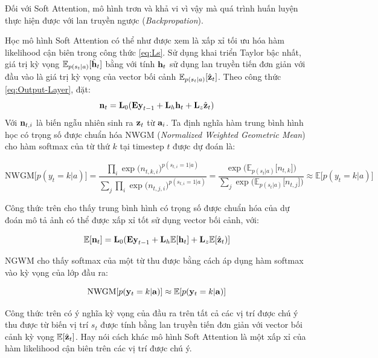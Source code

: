 \documentclass[14pt, a4paper]{article}
\numberwithin{equation}{section}
\numberwithin{algorithm}{section}
\numberwithin{figure}{section}
\numberwithin{dl}{section}
\numberwithin{md}{section}
\numberwithin{bd}{section}
\numberwithin{dn}{section}
\numberwithin{hq}{section}
\begin{document}
\begin{enumerate}[label=(\alph*)]
        Đối với Soft Attention, mô hình trơn và khả vi vì vậy mà quá trình huấn luyện thực hiện được với lan truyền ngược (\textit{Backpropation}).

        Học mô hình Soft Attention có thể như được xem là xấp xỉ tối ưu hóa hàm likelihood cận biên trong công thức \ref{eq:Ls}.
        Sử dụng khai triển Taylor bậc nhất, giá trị kỳ vọng $\mathbb{E}_{p(s_t \vert a)}\lbrack \hat{\bold{h}}_t \rbrack$ bằng với tính $\bold{h}_t$ sử dụng lan truyền tiến đơn giản với đầu vào là giá trị kỳ vọng của vector bối cảnh $\mathbb{E}_{p(s_t \vert a)}\lbrack \hat{\bold{z}}_t \rbrack$.
        Theo công thức \ref{eq:Output-Layer}, đặt:
        \begin{equation}
            \bold{n}_t = \bold{L}_0(\bold{Ey}_{t-1} + \bold{L}_h\bold{h}_t + \bold{L}_z \hat{\bold{z}}_t)
        \end{equation}
        Với $\bold{n}_{t,i}$ là biến ngẫu nhiên sinh ra $\bold{z}_t$ từ $\bold{a}_i$. Ta định nghĩa hàm trung bình hình học có trọng số được chuẩn hóa NWGM (\textit{Normalized Weighted Geometric Mean}) cho hàm softmax của từ thứ $k$ tại timestep $t$ được dự đoán là:

        \begin{equation}
            \mathrm{NWGM}\lbrack p(y_t=k\vert a) \rbrack=\dfrac{\displaystyle \prod_i \exp\big( n_{t, k, i} \big)^{p(s_{t,i}=1\vert a)}}{\displaystyle \sum_j \prod_i \exp\big( n_{t, j, i} \big)^{p(s_{t,i}=1\vert a)}}=\dfrac{\exp\big( \mathbb{E}_{p(s_t \vert a)} \lbrack n_{t,k} \rbrack  \big)}{\displaystyle \sum_j \exp \big(\mathbb{E}_{p(s_t \vert a)} \lbrack n_{t,j} \rbrack \big)}\approx \mathbb{E} \lbrack p(y_t=k \vert a)\rbrack
        \end{equation}

        Công thức trên cho thấy trung bình hình có trọng số được chuẩn hóa của dự đoán mô tả ảnh có thể được xấp xỉ tốt sử dụng vector bối cảnh, với:

        \begin{equation}
            \mathbb {E}\lbrack \bold{n}_t \rbrack = \bold{L}_0(\bold{Ey}_{t-1} + \bold{L}_h \mathbb{E} \lbrack \bold{h}_t \rbrack + \bold{L}_z \mathbb{E} \lbrack \hat{\bold{z}}_t) \rbrack
        \end{equation}

        NGWM cho thấy softmax của một từ thu được bằng cách áp dụng hàm softmax vào kỳ vọng của lớp đầu ra:

        \begin{equation}
            \mathrm{NWGM}\lbrack p(\bold{y}_t = k \vert \bold{a}) \rbrack \approx \mathbb{E} \lbrack p(\bold{y}_t = k \vert \bold{a}) \rbrack
        \end{equation}

        Công thức trên có ý nghĩa kỳ vọng của đầu ra trên tất cả các vị trí được chú ý thu được từ biến vị trí $s_t$ được tính bằng lan truyền tiến đơn giản với vector bối cảnh kỳ vọng $\mathbb{E} \lbrack \hat{\bold{z}}_t \rbrack$.
        Hay nói cách khác mô hình Soft Attention là một xấp xỉ của hàm likelihood cận biên trên các vị trí được chú ý.
    \end{enumerate}
\end{document}
